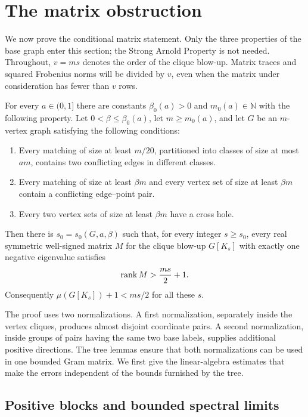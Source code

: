 \section{The matrix obstruction}\label{mr:section}

We now prove the conditional matrix statement.  Only the three
properties of the base graph enter this section; the Strong Arnold
Property is not needed.  Throughout, $v=ms$ denotes the order of the
clique blow-up.  Matrix traces and squared Frobenius norms will be divided
by $v$, even when the matrix under consideration has fewer than $v$
rows.

\begin{theorem}\label{thm:matrix-obstruction}
For every $a\in(0,1]$ there are constants $\beta_0(a)>0$ and
$m_0(a)\in\mathbb N$ with the following property.  Let
$0<\beta\le\beta_0(a)$, let $m\ge m_0(a)$, and let $G$ be an
$m$-vertex graph satisfying the following conditions:
\begin{enumerate}[label=\textup{(\roman*)}]
\item Every matching of size at least $m/20$, partitioned into classes
of size at most $am$, contains two conflicting edges in different
classes.
\item Every matching of size at least $\beta m$ and every vertex set of
size at least $\beta m$ contain a conflicting edge--point pair.
\item Every two vertex sets of size at least $\beta m$ have a cross hole.
\end{enumerate}
Then there is $s_0=s_0(G,a,\beta)$ such that, for every integer
$s\ge s_0$, every real symmetric well-signed matrix $M$ for the clique
blow-up $G[K_s]$ with exactly one negative eigenvalue satisfies
\[
  \operatorname{rank} M>\frac{ms}{2}+1.
\]
Consequently $\mu(G[K_s])+1<ms/2$ for all these $s$.
\end{theorem}

The proof uses two normalizations.  A first normalization, separately
inside the vertex cliques, produces almost disjoint coordinate pairs.
A second normalization, inside groups of pairs having the same two base
labels, supplies additional positive directions.  The tree lemmas ensure
that both normalizations can be used in one bounded Gram matrix.  We first
give the linear-algebra estimates that make the errors independent of the
bounds furnished by the tree.

\subsection{Positive blocks and bounded spectral limits}

